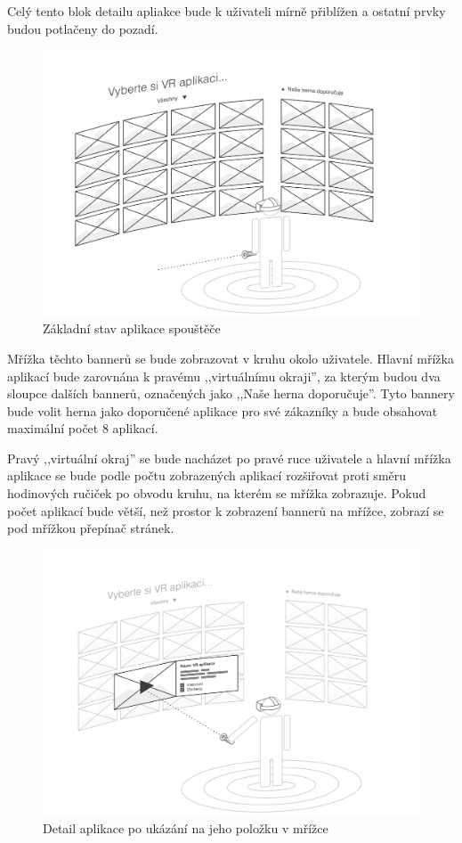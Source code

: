 Celý tento blok
detailu apliakce bude k uživateli mírně přiblížen a ostatní prvky budou
potlačeny do pozadí.

\begin{figure}[h!]
\centering
\includegraphics[width=\textwidth]{src/assets/wireframe-grid.pdf}
\caption{Základní stav aplikace spouštěče}
\end{figure}

Mřížka těchto bannerů se bude zobrazovat v kruhu okolo uživatele. Hlavní
mřížka aplikací bude zarovnána k pravému ,,virtuálnímu okraji'', za
kterým budou dva sloupce dalších bannerů, označených jako ,,Naše herna
doporučuje''. Tyto bannery bude volit herna jako doporučené aplikace pro
své zákazníky a bude obsahovat maximální počet 8 aplikací. 

Pravý ,,virtuální okraj'' se bude nacházet po pravé ruce uživatele a hlavní
mřížka aplikace se bude podle počtu zobrazených aplikací rozšiřovat
proti směru hodinových ručiček po obvodu kruhu, na kterém se mřížka
zobrazuje. Pokud počet aplikací bude větší, než prostor k zobrazení
bannerů na mřížce, zobrazí se pod mřížkou přepínač stránek.

\begin{figure}[h!]
\centering
\includegraphics[width=\textwidth]{src/assets/wireframe-detail.pdf}
\caption{Detail aplikace po ukázání na jeho položku v mřížce}
\end{figure}

